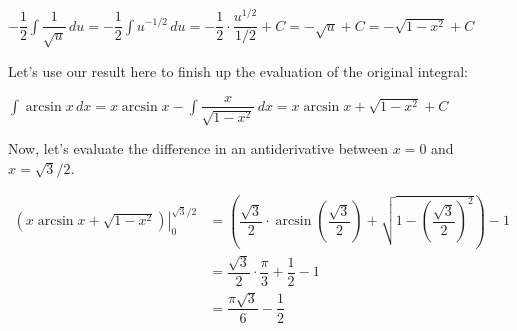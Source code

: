 \documentclass{article}
\begin{document}
\begin{enumerate}
\begin{enumerate}
\begin{solution}
\begin{center}
    $\displaystyle -\dfrac{1}{2} \int \dfrac{1}{\sqrt{u}}\,du = \displaystyle -\dfrac{1}{2} \int u^{-1/2}\,du = -\dfrac{1}{2}\cdot\dfrac{u^{1/2}}{1/2}+C=-\sqrt{u}+C=-\sqrt{1-x^2}+C$
\end{center}

Let's use our result here to finish up the evaluation of the original integral:

\begin{center}
$\displaystyle \int \arcsin x\,dx = x\arcsin x - \displaystyle \int \dfrac{x}{\sqrt{1-x^2}} \,dx=x\arcsin x + \sqrt{1-x^2}+C$    
\end{center}

Now, let's evaluate the difference in an antiderivative between $x=0$ and $x=\sqrt{3}/2$.

\begin{align*}
\left. \left(x\arcsin x + \sqrt{1-x^2}\right) \right|_{0}^{\sqrt{3}/2} &= \left( \dfrac{\sqrt{3}}{2}\cdot \arcsin \left( \dfrac{\sqrt{3}}{2}\right)+\sqrt{1-\left(\dfrac{\sqrt{3}}{2}\right)^2}\right) - 1\\
&=\dfrac{\sqrt{3}}{2}\cdot\dfrac{\pi}{3}+\dfrac{1}{2}-1\\
&=\dfrac{\pi\sqrt{3}}{6}-\dfrac{1}{2}
\end{align*}
        \end{solution}
        \pspace{\newpage}

    \end{enumerate}
    \end{enumerate}
   \pspace{\newpage}
   
\end{document}
